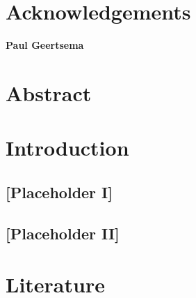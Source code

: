 \documentclass[12pt]{article}
\begin{document}
\section*{Acknowledgements}
\begin{center}
	\textbf{Paul Geertsema}
\end{center}
\newpage
\section*{Abstract}
\newpage
\tableofcontents
\listoffigures
\listoftables
\newpage 
{} 
\section{Introduction}
\subsection{[Placeholder I]}
\newpage
\subsection{[Placeholder II]}
\newpage
\section{Literature}\label{LR}
\end{document}
